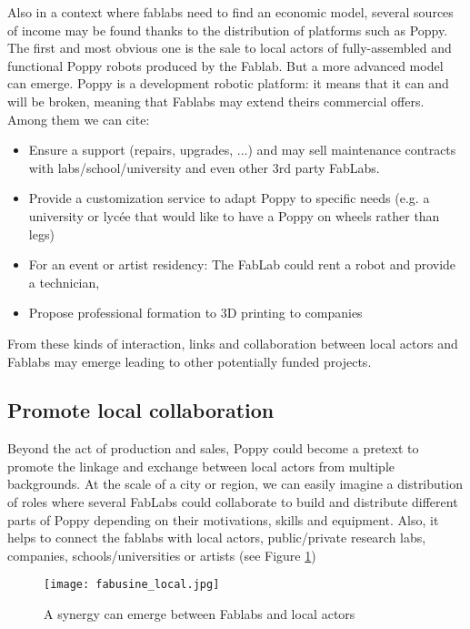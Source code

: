 Also in a context where fablabs need to find an economic model, several sources of income may be found thanks to the distribution of platforms such as Poppy. The first and most obvious one is the sale to local actors of fully-assembled and functional Poppy robots produced by the Fablab. But a more advanced model can emerge. Poppy is a development robotic platform: it means that it can and will be broken, meaning that Fablabs may extend theirs commercial offers. Among them we can cite:

\begin{itemize}
    \item Ensure a support (repairs, upgrades, ...) and may sell maintenance contracts with labs/school/university and even other 3rd party FabLabs.
    \item Provide a customization service to adapt Poppy to specific needs (e.g. a university or lycée that would like to have a Poppy on wheels rather than legs)
    \item For an event or artist residency: The FabLab could rent a robot and provide a technician,
    \item Propose professional formation to 3D printing to companies
\end{itemize}

From these kinds of interaction, links and collaboration between local actors and Fablabs may emerge leading to other potentially funded projects.

\subsection{Promote local collaboration} %

Beyond the act of production and sales, Poppy could become a pretext to promote the linkage and exchange between local actors from multiple backgrounds. At the scale of a city or region, we can easily imagine a distribution of roles where several FabLabs could collaborate to build and distribute different parts of Poppy depending on their motivations, skills and equipment.
Also, it helps to connect the fablabs with local actors, public/private research labs, companies, schools/universities or artists (see Figure \ref{fig:local_synergy})

\begin{figure}[tb]
    \begin{center}
        \texttt{[image: fabusine\_local.jpg]}
    \end{center}
    \caption{A synergy can emerge between Fablabs and local actors}
    \label{fig:local_synergy}
\end{figure}

